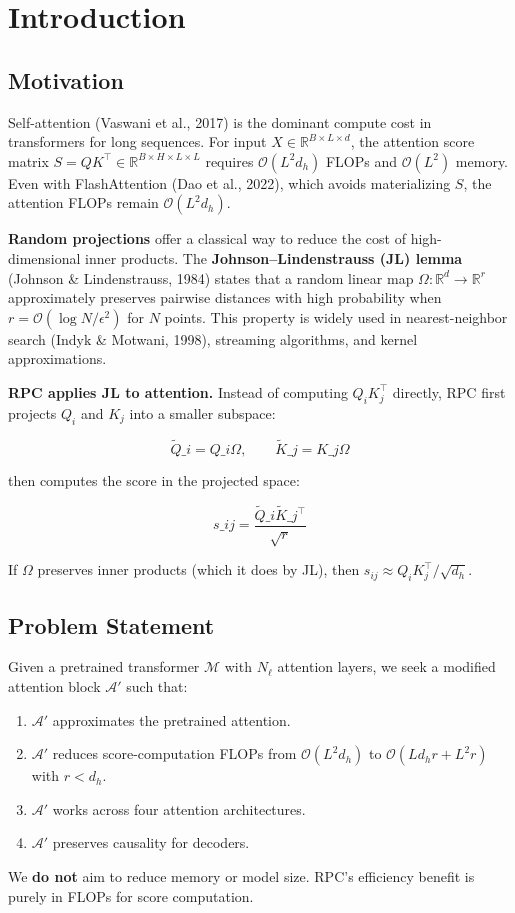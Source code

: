 
\section{Introduction}

\subsection{Motivation}

Self-attention (Vaswani et al., 2017) is the dominant compute cost in 
transformers for long sequences. For input $X \in \mathbb{R}^{B \times L \times d}$, 
the attention score matrix $S = Q K^\top \in \mathbb{R}^{B \times H \times L \times L}$ 
requires $\mathcal{O}(L^2 d_h)$ FLOPs and $\mathcal{O}(L^2)$ memory. Even 
with FlashAttention (Dao et al., 2022), which avoids materializing $S$, the 
attention FLOPs remain $\mathcal{O}(L^2 d_h)$.

\textbf{Random projections} offer a classical way to reduce the cost of 
high-dimensional inner products. The \textbf{Johnson--Lindenstrauss (JL) lemma} 
(Johnson \& Lindenstrauss, 1984) states that a random linear map 
$\Omega : \mathbb{R}^d \to \mathbb{R}^r$ approximately preserves pairwise 
distances with high probability when $r = \mathcal{O}(\log N / \epsilon^2)$ 
for $N$ points. This property is widely used in nearest-neighbor search 
(Indyk \& Motwani, 1998), streaming algorithms, and kernel approximations.

\textbf{RPC applies JL to attention.} Instead of computing $Q_i K_j^\top$ directly, 
RPC first projects $Q_i$ and $K_j$ into a smaller subspace:

\[
\tilde{Q}\_i = Q\_i \Omega, \qquad \tilde{K}\_j = K\_j \Omega
\tag{1.1}
\]

then computes the score in the projected space:

\[
s\_{ij} = \frac{\tilde{Q}\_i \tilde{K}\_j^\top}{\sqrt{r}}
\tag{1.2}
\]

If $\Omega$ preserves inner products (which it does by JL), then 
$s_{ij} \approx Q_i K_j^\top / \sqrt{d_h}$.

\subsection{Problem Statement}

Given a pretrained transformer $\mathcal{M}$ with $N_\ell$ attention layers, 
we seek a modified attention block $\mathcal{A}'$ such that:

\begin{enumerate}
\item $\mathcal{A}'$ approximates the pretrained attention.
\item $\mathcal{A}'$ reduces score-computation FLOPs from $\mathcal{O}(L^2 d_h)$
  to $\mathcal{O}(L d_h r + L^2 r)$ with $r < d_h$.
\item $\mathcal{A}'$ works across four attention architectures.
\item $\mathcal{A}'$ preserves causality for decoders.

\end{enumerate}
We \textbf{do not} aim to reduce memory or model size. RPC's efficiency benefit 
is purely in FLOPs for score computation.

